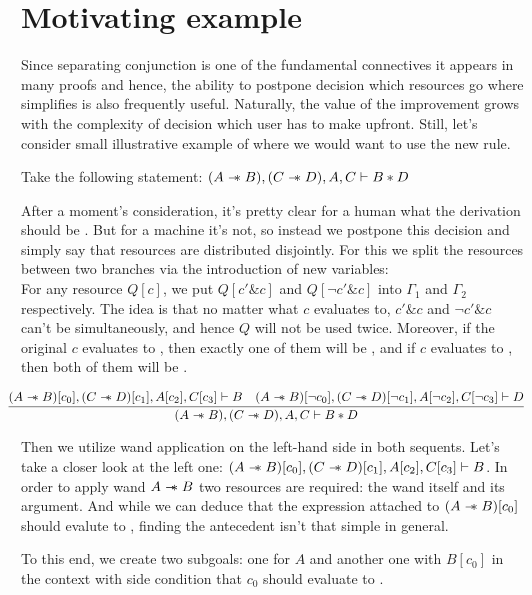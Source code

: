 \section{Motivating example}

Since separating conjunction is one of the fundamental connectives it appears in many proofs and hence, the ability to postpone decision which resources go where simplifies is also frequently useful.
Naturally, the value of the improvement grows with the complexity of decision which user has to make upfront.
Still, let's consider small illustrative example of where we would want to use the new rule.

Take the following statement:
\((A \mathrel{-\mkern-6mu*} B), (C \mathrel{-\mkern-6mu*} D), A, C \vdash B * D\)

After a moment's consideration, it's pretty clear for a human what the derivation should be .
But for a machine it's not, so instead we postpone this decision and simply say that resources are distributed disjointly.
For this we split the resources between two branches via the introduction of new variables:\\
For any resource \(Q[c]\), we put \(Q[c' \& c]\) and \(Q[\neg c' \& c]\) into \(\Gamma_1\) and \(\Gamma_2\) respectively.
The idea is that no matter what \(c\) evaluates to, \(c' \& c\) and \(\neg c' \& c\) can't be \true simultaneously, and hence \(Q\) will not be used twice.
Moreover, if the original \(c\) evaluates to \true, then exactly one of them will be \true, and if \(c\) evaluates to \false, then both of them will be \false.

\[\hspace{-0.03\linewidth}
\infer{(A \wand B), (C \wand D), A, C \vdash B \ast D}
      {(A \wand B)[c_0], (C \wand D)[c_1], A[c_2], C[c_3] \vdash B  &
       (A \wand B)[\neg c_0], (C \wand D)[\neg c_1] , A[\neg c_2] , C[\neg c_3] \vdash D}
\]

Then we utilize wand application on the left-hand side in both sequents.
Let's take a closer look at the left one: \((A \mathrel{-\mkern-6mu*} B)[c_0], (C \mathrel{-\mkern-6mu*} D)[c_1], A[c_2], C[c_3] \vdash B\).
In order to apply wand \(A \mathrel{-\mkern-6mu*} B\) two resources are required: the wand itself and its argument.
And while we can deduce that the expression attached to \((A \mathrel{-\mkern-6mu*} B)[c_0]\) should evalute to \true, finding the antecedent isn't that simple in general.

To this end, we create two subgoals: one for \(A\) and another one with \(B[c_0]\) in the context with side condition that \(c_0\) should evaluate to \true.

